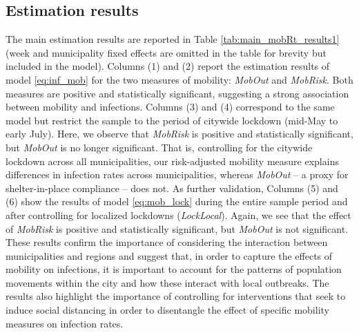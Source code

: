 
\subsection{Estimation results} \label{sec:inf_model_results}
    
The main estimation results are reported in Table \ref{tab:main_mobRt_results1} (week and municipality fixed effects are omitted in the table for brevity but included in the model). Columns (1) and (2) report the estimation results of model \eqref{eq:inf_mob} for the two measures of mobility: \textit{MobOut} and \textit{MobRisk}. Both measures are positive and statistically significant, suggesting a strong association between mobility and infections. Columns (3) and (4) correspond to the same model but restrict the sample to the period of citywide lockdown (mid-May to early July). Here, we observe that \textit{MobRisk} is positive and statistically significant, but \textit{MobOut} is no longer significant. That is, controlling for the citywide lockdown across all municipalities, our risk-adjusted mobility measure explains differences in infection rates across municipalities, whereas \textit{MobOut} -- a proxy for shelter-in-place compliance -- does not. As further validation, Columns (5) and (6) show the results of model \eqref{eq:mob_lock} during the entire sample period and after controlling for localized lockdowns (\textit{LockLocal}). Again, we see that the effect of \textit{MobRisk} is positive and statistically significant, but \textit{MobOut} is not significant. These results confirm the importance of considering the interaction between municipalities and regions \citep{holtz2020interdependence,akbarpour2020socioeconomic,birge2020controlling,fajgelbaum2020optimal,zubi2020} and suggest that, in order to capture the effects of mobility on infections, it is important to account for the patterns of population movements within the city and how these interact with local outbreaks. The results also highlight the importance of controlling for interventions that seek to induce social distancing in order to disentangle the effect of specific mobility measures on infection rates.

